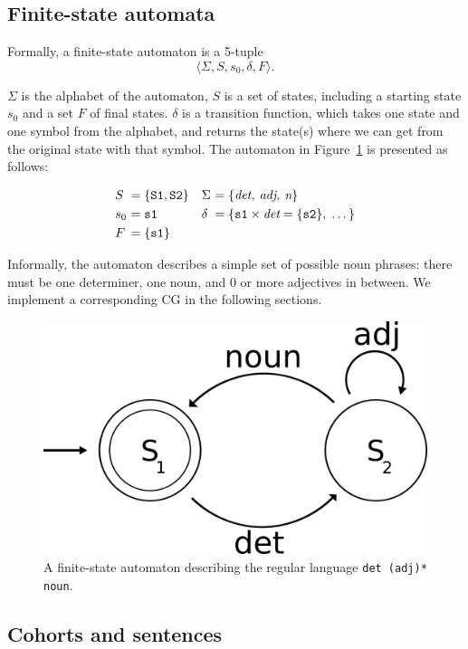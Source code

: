 \documentclass[11pt]{article}
\def\t#1{\texttt{#1}}
\begin{document}
\subsection{Finite-state automata}
Formally, a finite-state automaton is a 5-tuple
\[
  \langle \Sigma, S, s_0, \delta, F \rangle.
\]


$\Sigma$ is the alphabet of the automaton, $S$ is a set of states,
including a starting state $s_0$ and a set $F$ of final states.
$\delta$ is a transition function, which takes one state and one
symbol from the alphabet, and returns the state(s) where we can get
from the original state with that symbol.
The automaton in Figure~\ref{fig:fsa} is presented as follows:

\[\!
\begin{aligned}
  &S&      \!\!\!\!=\;& \{\t{S1}, \t{S2}\}   &&\Sigma& \!\!\!\!=\;& \{\emph{det, adj, n}\} \\
  &s_0&    \!\!\!\!=\;& \t{s1}               &&\delta&  \!\!\!\!=\;& \{\t{s1} \times \emph{det} = \{\t{s2}\}, \; \dots \}  \\ 
  &F&      \!\!\!\!=\;& \{\t{s1}\}           &&      & & %
\end{aligned}
\]

Informally, the automaton describes a simple set of possible noun
phrases: there must be one determiner, one noun, and 0 or more
adjectives in between. 
We implement a corresponding CG in the following sections.

\begin{figure}[t]
  \centering
  \includegraphics[width=0.6\linewidth]{fsa.png}
  \caption{A finite-state automaton describing the regular language \t{det
      (adj)* noun}.}
 \label{fig:fsa}
\end{figure}


\subsection{Cohorts and sentences}
\end{document}
